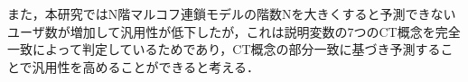 \documentclass[submit,ses,noauthor]{ipsj}
\begin{document}
また，本研究ではN階マルコフ連鎖モデルの階数Nを大きくすると予測できないユーザ数が増加して汎用性が低下したが，これは説明変数の7つのCT概念を完全一致によって判定しているためであり，CT概念の部分一致に基づき予測することで汎用性を高めることができると考える．

 
\end{document}
